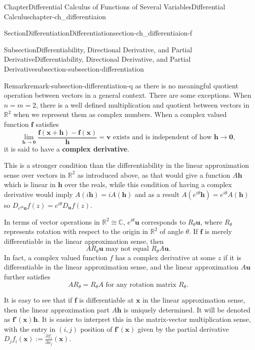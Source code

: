 \documentclass[oneside,10pt,]{book}
\newcommand{\terminology}[1]{\textbf{#1}}
\numberwithin{equation}{section}
\newcommand{\bff}{\mathbf{f}}
\newcommand{\bh}{\mathbf{h}}
\newcommand{\bbR}{\mathbb{R}}
\begin{document}
\begin{chapterptx}{Chapter}{Differential Calculus of Functions of Several Variables}{}{Differential Calculus}{}{}{chapter-ch_differentiaion}
\begin{sectionptx}{Section}{Differentiation}{}{Differentiation}{}{}{section-ch_differentiaion-f}
\begin{subsectionptx}{Subsection}{Differentiability, Directional Derivative, and Partial Derivative}{}{Differentiability, Directional Derivative, and Partial Derivative}{}{}{subsection-subsection-differentiation}
\begin{remark}{Remark}{}{remark-subsection-differentiation-q}
as there is no meaningful quotient operation between vectors in a general context. There are some exceptions. When \(n=m=2\), there is a well defined multiplication and quotient between vectors in \({\mathbb R}^{2}\) when we represent them as complex numbers. When a complex valued function \(\bff\) satisfies%
\begin{equation*}
\lim_{{\mathbf h} \to {\mathbf 0}}\frac{ {\mathbf f}({\mathbf x}+{\mathbf h})- {\mathbf f}({\mathbf x})}{{\mathbf h}}={\mathbf v} \text{ exists and is independent of how } {\mathbf h} \to {\mathbf 0},
\end{equation*}
it is said to have a \terminology{complex derivative}.%
\par
This is a stronger condition than the differentiability in the linear approximation sense over vectors in \(\bbR^{2}\) as introduced above, as that would give a function \(A\bh\) which is linear in \(\bh\) over the reals, while this condition of having a complex derivative would imply \(A(i \bh)=i A(\bh)\) and as a result \(A(e^{i\theta} \bh)=e^{i\theta} A(\bh)\) so \(D_{e^{i\theta} {\mathbf u}}f(z)=e^{i\theta }D_{{\mathbf u}}f(z).\)%
\par
In terms of vector operations in \({\mathbb R}^{2}\cong \mathbb C\), \(e^{i\theta} {\mathbf u}\) corresponds to \(R_{\theta} {\mathbf u}\), where \(R_{\theta} \) represents rotation with respect to the origin in \({\mathbb R}^{2}\) of angle \(\theta\).  If \(\bff\) is merely differentiable in the linear approximation sense, then%
\begin{equation*}
A R_{\theta} {\mathbf u} \text{ may not equal } R_{\theta}A {\mathbf u}.
\end{equation*}
In fact, a complex valued function \(f\) has a complex derivative at some \(z\) if it is differentiable in the linear approximation sense, and the linear approximation \(A {\mathbf u}\) further satisfies%
\begin{equation}
A R_{\theta}= R_{\theta}A \text{ for any rotation matrix } R_{\theta}.\label{men-cpxcmm}
\end{equation}
%
\end{remark}
It is easy to see that if \({\mathbf f}\) is differentiable at \({\mathbf x}\) in the linear approximation sense, then the linear approximation part \(A {\mathbf h}\) is uniquely determined. It will be denoted as \({\mathbf f}'({\mathbf x}){\mathbf h} \). It is easier to interpret this in the matrix-vector multiplication sense, with the entry in \((i, j)\) position of \({\mathbf f}'({\mathbf x})\) given by the partial derivative \(D_{j}f_{i}({\mathbf x}):=\frac{\partial f_{i} }{\partial x_{j}}({\mathbf x})\).%

\end{subsectionptx}
\end{sectionptx}
\end{chapterptx}
\end{document}
